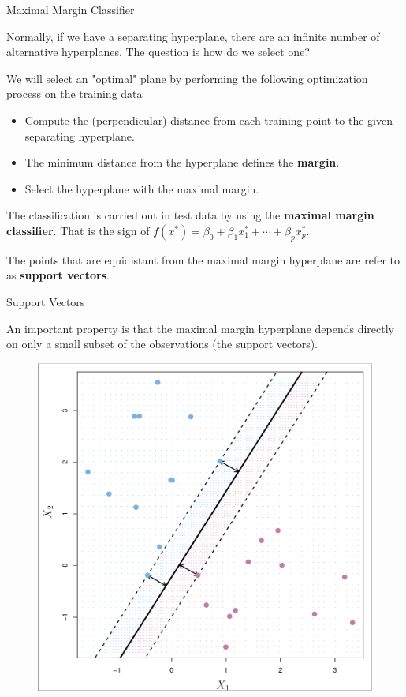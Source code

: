 \documentclass{beamer}
\begin{document}
\begin{frame}{Maximal Margin Classifier}
	
	Normally, if we have a separating hyperplane, there are an infinite number of alternative hyperplanes. The question is how do we select one?
	
	We will select an "optimal" plane by performing the following optimization process on the training data
	
	\begin{itemize}
		\item Compute the (perpendicular) distance from each training point to the given separating hyperplane.
		\item The minimum distance from the hyperplane defines the {\bf margin}.
		\item Select the hyperplane with the maximal margin.
	\end{itemize}
	The classification is carried out in test data by using the {\bf maximal margin classifier}. That is the sign of $f(x^*)= \beta_0 + \beta_1 x_1^* + \cdots + \beta_p x_p^*$. 
	
	The points that are equidistant from the maximal margin hyperplane are refer to as {\bf support vectors}. 
\end{frame}

\begin{frame}{Support Vectors}
	
	An important property is that the maximal margin hyperplane depends directly on only a small subset of the observations (the support vectors).
	
		\begin{figure}[h]
		\centering
		\includegraphics[scale=0.35]{../../Figures/fig_support_vectors.png}
	\end{figure}	
\end{frame}
\end{document}
